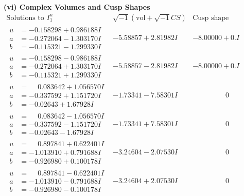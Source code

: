 \documentclass[1p]{elsarticle_modified}
\theoremstyle{definition}
\newcommand{\I}{\sqrt{-1}}
\begin{document}
\newpage\flushleft \textbf{(vi) Complex Volumes and Cusp Shapes}
$$\begin{array}{c|c|c}  
\text{Solutions to }I^u_{1}& \I (\text{vol} + \sqrt{-1}CS) & \text{Cusp shape}\\
 \hline 
\begin{aligned}
u &= -0.158298 + 0.986188 I \\
a &= -0.272064 - 1.303170 I \\
b &= -0.115321 - 1.299330 I\end{aligned}
 & -5.58857 + 2.81982 I & -8.00000 + 0. I\phantom{ +0.000000I} \\ \hline\begin{aligned}
u &= -0.158298 - 0.986188 I \\
a &= -0.272064 + 1.303170 I \\
b &= -0.115321 + 1.299330 I\end{aligned}
 & -5.58857 - 2.81982 I & -8.00000 + 0. I\phantom{ +0.000000I} \\ \hline\begin{aligned}
u &= \phantom{-}0.083642 + 1.056570 I \\
a &= -0.337592 + 1.151720 I \\
b &= -0.02643 + 1.67928 I\end{aligned}
 & -1.73341 - 7.58301 I & \phantom{-0.000000 } 0 \\ \hline\begin{aligned}
u &= \phantom{-}0.083642 - 1.056570 I \\
a &= -0.337592 - 1.151720 I \\
b &= -0.02643 - 1.67928 I\end{aligned}
 & -1.73341 + 7.58301 I & \phantom{-0.000000 } 0 \\ \hline\begin{aligned}
u &= \phantom{-}0.897841 + 0.622401 I \\
a &= -1.013910 + 0.791688 I \\
b &= -0.926980 + 0.100178 I\end{aligned}
 & -3.24604 - 2.07530 I & \phantom{-0.000000 } 0 \\ \hline\begin{aligned}
u &= \phantom{-}0.897841 - 0.622401 I \\
a &= -1.013910 - 0.791688 I \\
b &= -0.926980 - 0.100178 I\end{aligned}
 & -3.24604 + 2.07530 I & \phantom{-0.000000 } 0 \\ \hline\begin{aligned}

\end{aligned}
\end{array}$$
\end{document}

